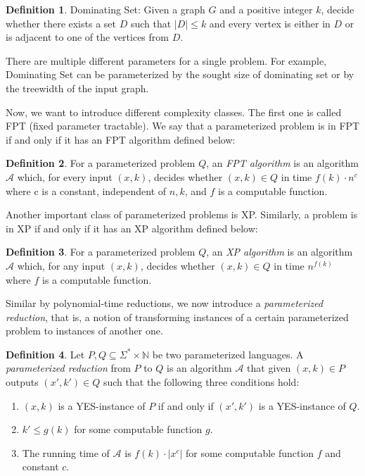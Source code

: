 \documentclass[en]{pracamgr}
\theoremstyle{definition}
\newtheorem{definition}{Definition}
\newcommand{\domsetp}{{\sc Dominating Set}}
\begin{document}
\begin{definition}
	\domsetp{}: Given a graph $G$ and a positive integer $k$, decide whether there exists a set $D$ such that $|D| \leq k$ and every vertex is either in $D$ or is adjacent to one of the vertices from $D$.
\end{definition}

There are multiple different parameters for a single problem. For example, \domsetp{} can be parameterized by the sought size of dominating set or by the treewidth of the input graph. 

Now, we want to introduce different complexity classes. The first one is called FPT (fixed parameter tractable). We say that a parameterized problem is in FPT if and only if it has an FPT algorithm defined below:

\begin{definition}\label{FPT algorithm}
	For a parameterized problem $Q$, an \textit{FPT algorithm} is an algorithm $\mathcal{A}$ which, for every input $(x,k)$, decides whether $(x,k) \in Q$ in time $f(k)\cdot n^c$ where c is a constant, independent of $n,k$, and $f$ is a computable function.
\end{definition}

\noindent
Another important class of parameterized problems is XP. Similarly, a problem is in XP if and only if it has an XP algorithm defined below:

\begin{definition}
	For a parameterized problem $Q$, an \textit{XP algorithm} is an algorithm $\mathcal{A}$ which, for any input $(x,k)$, decides whether $(x,k) \in Q$ in time $n^{f(k)}$ where $f$ is a computable function.
\end{definition}

Similar by polynomial-time reductions, we now introduce a \textit{parameterized reduction}, that is, a notion of transforming instances of a certain parameterized problem to instances of another one.

\begin{definition}
	Let $P,Q \subseteq \Sigma^* \times \mathbb{N}$ be two parameterized languages. A  \textit{parameterized reduction} from $P$ to $Q$ is an algorithm $\mathcal{A}$ that given $(x,k) \in P$ outputs $(x',k') \in Q$ such that the following three conditions hold:
	\begin{enumerate}
		\item $(x,k)$ is a YES-instance of $P$ if and only if $(x',k')$ is a YES-instance of $Q$.
		\item $k' \leq g(k)$ for some computable function $g$.
		\item The running time of $\mathcal{A}$ is $f(k) \cdot |x^c|$ for some computable function $f$ and constant $c$.
	\end{enumerate}
\end{definition}
\end{document}
